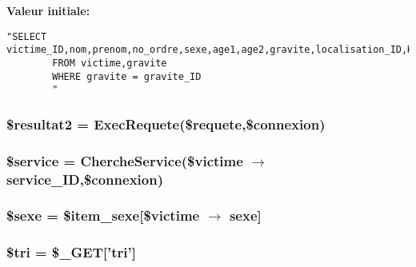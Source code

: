 {\bf Valeur initiale:}

\footnotesize\begin{verbatim}"SELECT victime_ID,nom,prenom,no_ordre,sexe,age1,age2,gravite,localisation_ID,Hop_ID,service_ID,conta_N,conta_B,conta_C,gravite_couleur,gravite_nom
        FROM victime,gravite
        WHERE gravite = gravite_ID
        "
\end{verbatim}\normalsize 
\hypertarget{liste__victime_8php_a8}{
\subsubsection[\$resultat2]{\setlength{\rightskip}{0pt plus 5cm}\$resultat2 = Exec\-Requete(\$requete,\$connexion)}}
\label{liste__victime_8php_a8}


\hypertarget{liste__victime_8php_a11}{
\subsubsection[\$service]{\setlength{\rightskip}{0pt plus 5cm}\$service = Cherche\-Service(\$victime $\rightarrow$ service\_\-ID,\$connexion)}}
\label{liste__victime_8php_a11}


\hypertarget{liste__victime_8php_a7}{
\subsubsection[\$sexe]{\setlength{\rightskip}{0pt plus 5cm}\$sexe = \$item\_\-sexe\mbox{[}\$victime $\rightarrow$ sexe\mbox{]}}}
\label{liste__victime_8php_a7}


\hypertarget{liste__victime_8php_a2}{
\subsubsection[\$tri]{\setlength{\rightskip}{0pt plus 5cm}\$tri = \$\_\-GET\mbox{[}'tri'\mbox{]}}}
\label{liste__victime_8php_a2}


